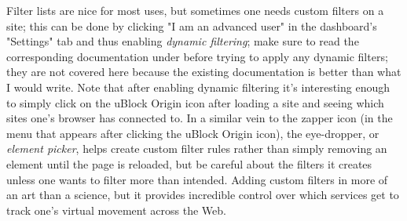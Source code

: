 \documentclass{article}
\begin{document}
Filter lists are nice for most uses, but sometimes one needs custom filters on a site; this can be done by clicking "I am an advanced user" in the dashboard's "Settings" tab and thus enabling \textit{dynamic filtering}; make sure to read the corresponding documentation under  before trying to apply any dynamic filters; they are not covered here because the existing documentation is better than what I would write.  Note that after enabling dynamic filtering it's interesting enough to simply click on the uBlock Origin icon after loading a site and seeing which sites one's browser has connected to.  In a similar vein to the zapper icon (in the menu that appears after clicking the uBlock Origin icon), the eye-dropper, or \textit{element picker}, helps create custom filter rules rather than simply removing an element until the page is reloaded, but be careful about the filters it creates unless one wants to filter more than intended.  Adding custom filters in more of an art than a science, but it provides incredible control over which services get to track one's virtual movement across the Web.
\end{document}
